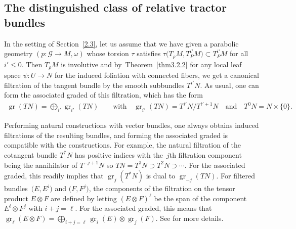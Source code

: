 \documentclass[10pt,a4paper]{amsart}
\numberwithin{equation}{section}
\def\Cal{\mathcal}
\newcommand{\x}{\times}
\newcommand{\om}{\omega}
\newcommand{\gr}{\operatorname{gr}}
\begin{document}
\subsection{The distinguished class of relative tractor bundles}\label{3.3}
In the setting of Section~\ref{2.3}, let us assume that we have given a parabolic geometry
${(p\colon \Cal G\!\to\! M,\om)}$ whose torsion $\tau$ satisfies $\tau\bigl(T_\rho M,T^{i'}_PM\bigr)\subset
T^{i'}_PM$ for all $i'\leq 0$. Then $T_\rho M$ is involutive and by~Theorem~\ref{thm3.2.2} for any local leaf space $\psi\colon U\to N$ for the induced foliation with
connected fibers, we get a canonical filtration of the tangent bundle by the smooth
subbundles $T^{i'}N$. As usual, one can form the associated graded of this
filtration, which has the form
\begin{gather*}
 \gr(TN)=\bigoplus_{i'}\gr_{i'}(TN) \qquad\text{with}\quad \gr_{i'}(TN)=T^{i'}N/T^{i'+1}N
\quad\text{and}\quad T^0N=N\x \{0\}.
\end{gather*}

Performing natural constructions with vector bundles, one always obtains induced
filtrations of the resulting bundles, and forming the associated graded is compatible
with the constructions. For example, the natural filtration of the cotangent bundle
$T^*N$ has positive indices with the~$j$th filtration component being the annihilator
of $T^{-j+1}N$ so $TN=T^1N\supset T^2N\supset\cdots$. For the associated graded, this
readily implies that $\gr_j(T^*N)$ is dual to $\gr_{-j}(TN)$. For filtered bundles~$\bigl(E,E^i\bigr)$
and $\bigl(F,F^j\bigr)$, the components of the filtration on the tensor product
$E\otimes F$ are defined by letting $(E\otimes F)^\ell$ be the span of the component
$E^i\otimes F^j$ with $i+j=\ell$. For the associated graded, this means that
$\gr_\ell(E\otimes F)=\bigoplus_{i+j=\ell}\gr_i(E)\otimes\gr_j(F)$. See
\cite[Section 3.1.1]{book} for more details.
\end{document}
